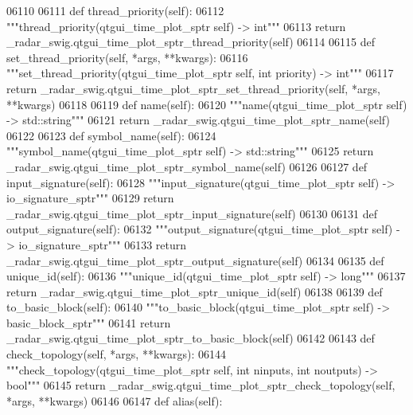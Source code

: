 \begin{DoxyCode}
{{{{{{{{{{{{{{{{{{{{06110 
06111     \textcolor{keyword}{def }thread_priority(self):
06112         \textcolor{stringliteral}{"""thread\_priority(qtgui\_time\_plot\_sptr self) -> int"""}
06113         \textcolor{keywordflow}{return} \_radar\_swig.qtgui\_time\_plot\_sptr\_thread\_priority(self)
06114 
06115     \textcolor{keyword}{def }set_thread_priority(self, *args, **kwargs):
06116         \textcolor{stringliteral}{"""set\_thread\_priority(qtgui\_time\_plot\_sptr self, int priority) -> int"""}
06117         \textcolor{keywordflow}{return} \_radar\_swig.qtgui\_time\_plot\_sptr\_set\_thread\_priority(self, *args, **kwargs)
06118 
06119     \textcolor{keyword}{def }name(self):
06120         \textcolor{stringliteral}{"""name(qtgui\_time\_plot\_sptr self) -> std::string"""}
06121         \textcolor{keywordflow}{return} \_radar\_swig.qtgui\_time\_plot\_sptr\_name(self)
06122 
06123     \textcolor{keyword}{def }symbol_name(self):
06124         \textcolor{stringliteral}{"""symbol\_name(qtgui\_time\_plot\_sptr self) -> std::string"""}
06125         \textcolor{keywordflow}{return} \_radar\_swig.qtgui\_time\_plot\_sptr\_symbol\_name(self)
06126 
06127     \textcolor{keyword}{def }input_signature(self):
06128         \textcolor{stringliteral}{"""input\_signature(qtgui\_time\_plot\_sptr self) -> io\_signature\_sptr"""}
06129         \textcolor{keywordflow}{return} \_radar\_swig.qtgui\_time\_plot\_sptr\_input\_signature(self)
06130 
06131     \textcolor{keyword}{def }output_signature(self):
06132         \textcolor{stringliteral}{"""output\_signature(qtgui\_time\_plot\_sptr self) -> io\_signature\_sptr"""}
06133         \textcolor{keywordflow}{return} \_radar\_swig.qtgui\_time\_plot\_sptr\_output\_signature(self)
06134 
06135     \textcolor{keyword}{def }unique_id(self):
06136         \textcolor{stringliteral}{"""unique\_id(qtgui\_time\_plot\_sptr self) -> long"""}
06137         \textcolor{keywordflow}{return} \_radar\_swig.qtgui\_time\_plot\_sptr\_unique\_id(self)
06138 
06139     \textcolor{keyword}{def }to_basic_block(self):
06140         \textcolor{stringliteral}{"""to\_basic\_block(qtgui\_time\_plot\_sptr self) -> basic\_block\_sptr"""}
06141         \textcolor{keywordflow}{return} \_radar\_swig.qtgui\_time\_plot\_sptr\_to\_basic\_block(self)
06142 
06143     \textcolor{keyword}{def }check_topology(self, *args, **kwargs):
06144         \textcolor{stringliteral}{"""check\_topology(qtgui\_time\_plot\_sptr self, int ninputs, int noutputs) -> bool"""}
06145         \textcolor{keywordflow}{return} \_radar\_swig.qtgui\_time\_plot\_sptr\_check\_topology(self, *args, **kwargs)
06146 
06147     \textcolor{keyword}{def }alias(self):
}}}}}}}}}}}}}}}}}}}}
\end{DoxyCode}
